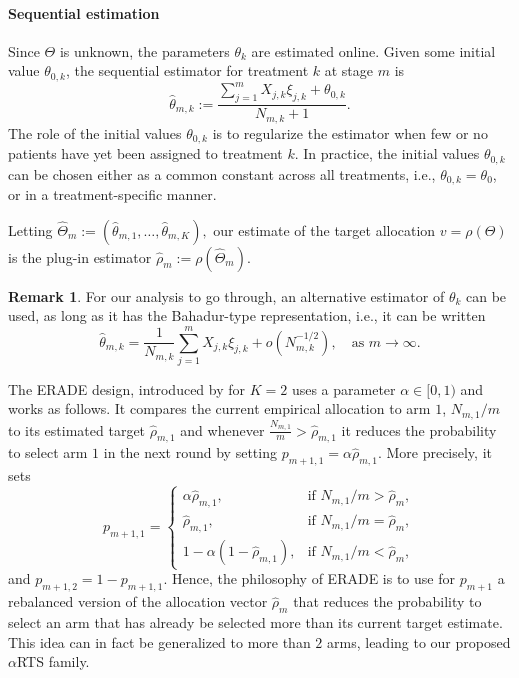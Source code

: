 \documentclass[11pt]{article}
\theoremstyle{plain}
\theoremstyle{definition}
\newtheorem{remark}[theorem]{Remark}
\begin{document}
\paragraph*{Sequential estimation} 
Since $\Theta$ is unknown, the parameters $\theta_k$ are estimated online. Given some initial value $\theta_{0,k}$, the sequential estimator for treatment $k$ at stage $m$ is
\begin{equation}\label{eq:dbcd-estimator}
	\hat{\theta}_{m,k} := \frac{\sum_{j=1}^m X_{j,k}\xi_{j,k} + \theta_{0,k}}{N_{m,k}+1}.
\end{equation}
The role of the initial values $\theta_{0,k}$ is to regularize the estimator when few or no patients have yet been assigned to treatment $k$. In practice, the initial values $\theta_{0,k}$ can be chosen either as a common constant across all treatments, i.e., $\theta_{0,k} = \theta_0$, or in a treatment-specific manner.

Letting \(\hat{\Theta}_m := (\hat{\theta}_{m,1}, \ldots, \hat{\theta}_{m,K}),\) our estimate of the target allocation $v=\rho(\Theta)$ is the plug-in estimator $\hat{\rho}_m := \rho(\hat{\Theta}_m).$


\begin{remark}
For our analysis to go through, an alternative estimator of $\theta_k$ can be used, as long as it has the Bahadur-type representation, i.e., it can be written
\begin{equation}\label{eq:bahadur-estimator}
	\hat{\theta}_{m,k} = \frac{1}{N_{m,k}}\sum_{j=1}^{m}X_{j,k}\xi_{j,k} + o(N_{m,k}^{-1/2}),\quad \text{as } m\to\infty.
\end{equation}
\end{remark}

The ERADE design, introduced by \cite{hu2009efficient} for $K=2$ uses a parameter $\alpha \in [0,1)$ and works as follows. It compares the current empirical allocation to arm $1$, $N_{m,1}/m$ to its estimated target $\hat{\rho}_{m,1}$ and whenever $\frac{N_{m,1}}{m}>\hat\rho_{m,1}$ it reduces the probability to select arm $1$ in the next round by setting $p_{m+1,1}=\alpha \hat\rho_{m,1}$.
More precisely, it sets
	\begin{equation*} \label{eq:erade}
		p_{m+1,1} =
		\begin{cases}
			\alpha \hat{\rho}_{m,1}, & \text{if } N_{m,1}/m > \hat{\rho}_m, \\[6pt]
			\hat{\rho}_{m,1}, & \text{if } N_{m,1}/m = \hat{\rho}_m, \\[6pt]
			1 - \alpha(1 - \hat{\rho}_{m,1}), & \text{if } N_{m,1}/m < \hat{\rho}_m,
		\end{cases}
	\end{equation*}
and $p_{m+1,2}=1-p_{m+1,1}$. Hence, the philosophy of ERADE is to use for $p_{m+1}$ a rebalanced version of the allocation vector $\hat{\rho}_m$ that reduces the probability to select an arm that has already be selected more than its current target estimate. This idea can in fact be generalized to more than $2$ arms, leading to our proposed $\alpha$RTS family.
\end{document}

